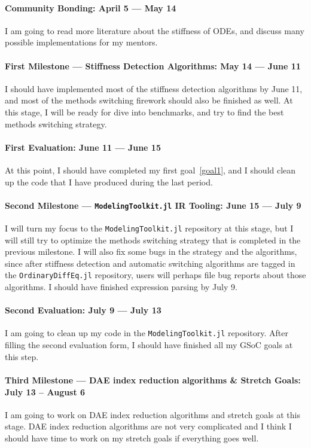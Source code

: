 \documentclass[12pt,a4paper]{article}
\begin{document}
\paragraph{Community Bonding: April 5 --- May 14}
I am going to read more literature about the stiffness of ODEs, and discuss
many possible implementations for my mentors.

\paragraph{First Milestone --- Stiffness Detection Algorithms: May 14 --- June
11}
I should have implemented most of the stiffness detection algorithms by June
11, and most of the methods switching firework should also be finished as well.
At this stage, I will be ready for dive into benchmarks, and try to find the
best methods switching strategy.

\paragraph{First Evaluation: June 11 --- June 15}
At this point, I should have completed my first goal~\ref{goal1}, and I should
clean up the code that I have produced during the last period.

\paragraph{Second Milestone --- \texttt{ModelingToolkit.jl} IR Tooling: June 15
--- July 9}
I will turn my focus to the \texttt{ModelingToolkit.jl} repository at this
stage, but I will still try to optimize the methods switching strategy that is
completed in the previous milestone. I will also fix some bugs in the strategy
and the algorithms, since after stiffness detection and automatic switching
algorithms are tagged in the \texttt{OrdinaryDiffEq.jl} repository, users will
perhaps file bug reports about those algorithms. I should have finished
expression parsing by July 9.

\paragraph{Second Evaluation: July 9 --- July 13}
I am going to clean up my code in the \texttt{ModelingToolkit.jl} repository.
After filling the second evaluation form, I should have finished all my GSoC
goals at this step.

\paragraph{Third Milestone --- DAE index reduction algorithms \& Stretch Goals:
July 13 -- August 6}
I am going to work on DAE index reduction algorithms and stretch goals at this
stage. DAE index reduction algorithms are not very complicated and I think I
should have time to work on my stretch goals if everything goes well.
\end{document}
